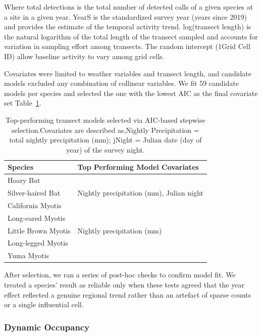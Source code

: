 \documentclass[
  letterpaper,
  DIV=11,
  numbers=noendperiod]{scrartcl}
\begin{document}
Where total detections is the total number of detected calls of a given
species at a site in a given year. YearS is the standardized survey year
(years since 2019) and provides the estimate of the temporal activity
trend. log(transect length) is the natural logarithm of the total length
of the transect sampled and accounts for variation in sampling effort
among transects. The random intercept (1\textbar Grid Cell ID) allow
baseline activity to vary among grid cells.

Covariates were limited to weather variables and transect length, and
candidate models excluded any combination of collinear variables. We fit
59 candidate models per species and selected the one with the lowest AIC
as the final covariate set Table~\ref{tbl-cov-transects}.

\begin{longtable}[l]{>{\raggedright\arraybackslash}p{15em}>{\raggedright\arraybackslash}p{25em}}

\caption{\label{tbl-cov-transects}Top-performing transect models
selected via AIC-based stepwise selection.Covariates are described
as,Nightly Precipitation = total nightly precipitation (mm); jNight =
Julian date (day of year) of the survey night.}

\tabularnewline

\toprule
Species & Top Performing Model Covariates\\
\midrule
Hoary Bat & \\
Silver-haired Bat & Nightly precipitation (mm), Julian night\\
California Myotis & \\
Long-eared Myotis & \\
Little Brown Myotis & Nightly precipitation (mm)\\
\addlinespace
Long-legged Myotis & \\
Yuma Myotis & \\
\bottomrule

\end{longtable}

After selection, we ran a series of post-hoc checks to confirm model
fit. We treated a species' result as reliable only when these tests
agreed that the year effect reflected a genuine regional trend rather
than an artefact of sparse counts or a single influential cell.

\subsubsection{Dynamic Occupancy}\label{dynamic-occupancy}
\end{document}
